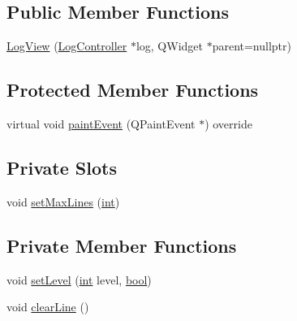 \subsection*{Public Member Functions}
\begin{DoxyCompactItemize}
\item 
\mbox{\hyperlink{class_q_g_b_a_1_1_log_view_a7bccf99af2ec77e478716a72b8b790e5}{Log\+View}} (\mbox{\hyperlink{class_q_g_b_a_1_1_log_controller}{Log\+Controller}} $\ast$log, Q\+Widget $\ast$parent=nullptr)
\end{DoxyCompactItemize}
\subsection*{Protected Member Functions}
\begin{DoxyCompactItemize}
\item 
virtual void \mbox{\hyperlink{class_q_g_b_a_1_1_log_view_afba18823777f16c5423e19a2b5379e82}{paint\+Event}} (Q\+Paint\+Event $\ast$) override
\end{DoxyCompactItemize}
\subsection*{Private Slots}
\begin{DoxyCompactItemize}
\item 
void \mbox{\hyperlink{class_q_g_b_a_1_1_log_view_a237ab0cd2c41fe85a3a8b254fb029c44}{set\+Max\+Lines}} (\mbox{\hyperlink{ioapi_8h_a787fa3cf048117ba7123753c1e74fcd6}{int}})
\end{DoxyCompactItemize}
\subsection*{Private Member Functions}
\begin{DoxyCompactItemize}
\item 
void \mbox{\hyperlink{class_q_g_b_a_1_1_log_view_a7c661fd0b6316bc62f71df6c39a1a715}{set\+Level}} (\mbox{\hyperlink{ioapi_8h_a787fa3cf048117ba7123753c1e74fcd6}{int}} level, \mbox{\hyperlink{libretro_8h_a4a26dcae73fb7e1528214a068aca317e}{bool}})
\item 
void \mbox{\hyperlink{class_q_g_b_a_1_1_log_view_ab58e52a5c481261805b6b0f3a08b22a3}{clear\+Line}} ()
\end{DoxyCompactItemize}
